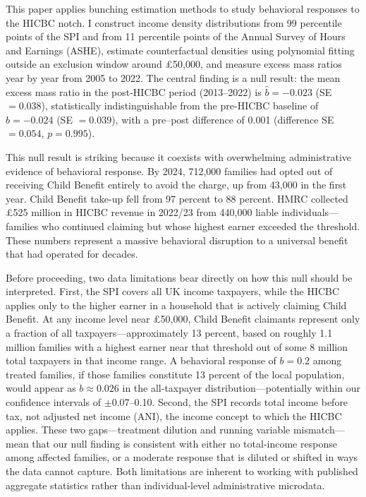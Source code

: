 \documentclass[12pt]{article}
\newcommand{\bhat}{\hat{b}}
\begin{document}
This paper applies bunching estimation methods \citep{kleven2013, kleven2016} to study behavioral responses to the HICBC notch. I construct income density distributions from 99 percentile points of the SPI and from 11 percentile points of the Annual Survey of Hours and Earnings (ASHE), estimate counterfactual densities using polynomial fitting outside an exclusion window around \pounds50,000, and measure excess mass ratios year by year from 2005 to 2022. The central finding is a null result: the mean excess mass ratio in the post-HICBC period (2013--2022) is $\bhat = -0.023$ (SE $= 0.038$), statistically indistinguishable from the pre-HICBC baseline of $\bhat = -0.024$ (SE $= 0.039$), with a pre--post difference of 0.001 (difference SE $= 0.054$, $p = 0.995$).

This null result is striking because it coexists with overwhelming administrative evidence of behavioral response. By 2024, 712,000 families had opted out of receiving Child Benefit entirely to avoid the charge, up from 43,000 in the first year. Child Benefit take-up fell from 97 percent to 88 percent. HMRC collected \pounds525 million in HICBC revenue in 2022/23 from 440,000 liable individuals---families who continued claiming but whose highest earner exceeded the threshold. These numbers represent a massive behavioral disruption to a universal benefit that had operated for decades.

Before proceeding, two data limitations bear directly on how this null should be interpreted. First, the SPI covers all UK income taxpayers, while the HICBC applies only to the higher earner in a household that is actively claiming Child Benefit. At any income level near \pounds50,000, Child Benefit claimants represent only a fraction of all taxpayers---approximately 13 percent, based on roughly 1.1 million families with a highest earner near that threshold out of some 8 million total taxpayers in that income range. A behavioral response of $b = 0.2$ among treated families, if those families constitute 13 percent of the local population, would appear as $b \approx 0.026$ in the all-taxpayer distribution---potentially within our confidence intervals of $\pm$0.07--0.10. Second, the SPI records total income before tax, not adjusted net income (ANI), the income concept to which the HICBC applies. These two gaps---treatment dilution and running variable mismatch---mean that our null finding is consistent with either no total-income response among affected families, or a moderate response that is diluted or shifted in ways the data cannot capture. Both limitations are inherent to working with published aggregate statistics rather than individual-level administrative microdata.
\end{document}
